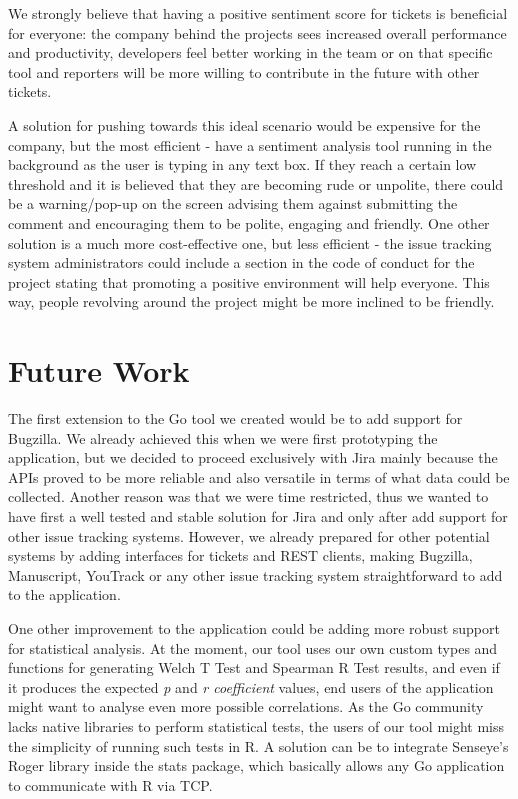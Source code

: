 \documentclass{mpaper}
\begin{document}
We strongly believe that having a positive sentiment score for tickets is beneficial for everyone: the company
behind the projects sees increased overall performance and productivity, developers feel better working in the team or
on that specific tool and reporters will be more willing to contribute in the future with other tickets.

A solution for pushing towards this ideal scenario would be expensive for the company, but the most efficient - have a 
sentiment analysis tool running in the background as the user is typing in any text box. If they reach a certain low 
threshold and it is believed that they are becoming rude or unpolite, there could be a warning/pop-up on the screen advising 
them against submitting the comment and encouraging them to be polite, engaging and friendly. One other solution
is a much more cost-effective one, but less efficient - the issue tracking system administrators could include a section 
in the code of conduct for the project stating that promoting a positive environment will help everyone. This way, people 
revolving around the project might be more inclined to be friendly.

\section{Future Work}\label{future_work}

The first extension to the Go tool we created would be to add support for Bugzilla. We already achieved this 
when we were first prototyping the application, but we decided to proceed exclusively with Jira mainly because 
the APIs proved to be more reliable and also versatile in terms of what data could be collected. Another 
reason was that we were time restricted, thus we wanted to have first a well tested and stable solution for Jira and 
only after add support for other issue tracking systems. However, we already prepared for other potential systems by 
adding interfaces for tickets and REST clients, making Bugzilla, Manuscript, YouTrack or any 
other issue tracking system straightforward to add to the application.

One other improvement to the application could be adding more robust support for statistical analysis. At the moment, 
our tool uses our own custom types and functions for generating Welch T Test and Spearman R Test results, and even if 
it produces the expected \emph{p} and \emph{r coefficient} values, end users of the application might want to 
analyse even more possible correlations. As the Go community lacks native libraries to perform statistical tests, 
the users of our tool might miss the simplicity of running such tests in R. A solution can be to integrate Senseye's 
Roger library \cite{r_stats} inside the stats package, which basically allows any Go application to communicate with 
R via TCP. 
\end{document}

